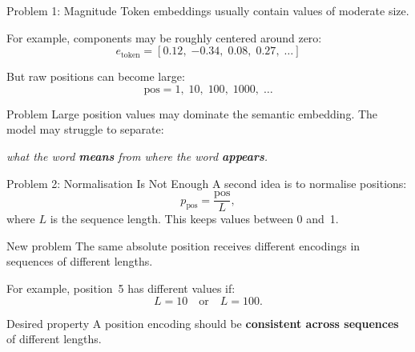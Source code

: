 \documentclass[aspectratio=169]{beamer}
\begin{document}
%
%
\begin{frame}{Problem 1: Magnitude}
  Token embeddings usually contain values of moderate size.

  For example, components may be roughly centered around zero:
  \[
    e_{\mathrm{token}} = [0.12,\; {-0.34},\; 0.08,\; 0.27,\; \ldots]
  \]

  But raw positions can become large:
  \[
    \mathrm{pos} = 1,\;10,\;100,\;1000,\;\ldots
  \]

  \begin{alertblock}{Problem}
    Large position values may dominate the semantic embedding.  The model may struggle
    to separate:
    \begin{center}
      \itshape what the word \textbf{means} from where the word \textbf{appears}.
    \end{center}
  \end{alertblock}
\end{frame}
%
%
\begin{frame}{Problem 2: Normalisation Is Not Enough}
  A second idea is to normalise positions:
  \[
    p_{\mathrm{pos}} = \frac{\mathrm{pos}}{L},
  \]
  where $L$ is the sequence length.  This keeps values between 0 and~1.

  \vspace{0.4em}
  \begin{alertblock}{New problem}
    The same absolute position receives different encodings in sequences of different
    lengths.

    For example, position~5 has different values if:
    \[
      L = 10 \quad\text{or}\quad L = 100.
    \]
  \end{alertblock}

  \begin{block}{Desired property}
    A position encoding should be \textbf{consistent across sequences} of different
    lengths.
  \end{block}
\end{frame}
%
%
\end{document}
